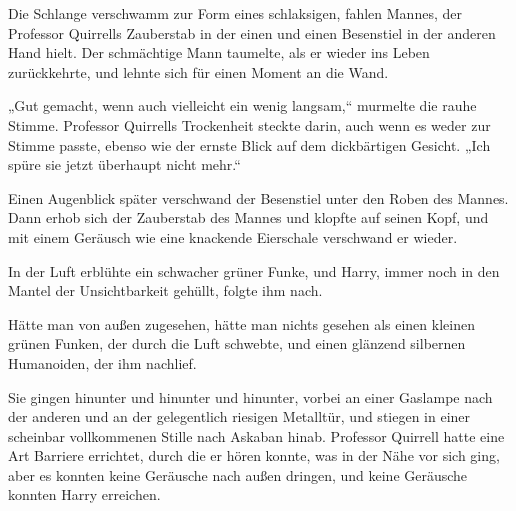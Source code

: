Die Schlange verschwamm zur Form eines schlaksigen, fahlen Mannes, der Professor Quirrells Zauberstab in der einen und einen Besenstiel in der anderen Hand hielt. Der schmächtige Mann taumelte, als er wieder ins Leben zurückkehrte, und lehnte sich für einen Moment an die Wand.

„Gut gemacht, wenn auch vielleicht ein wenig langsam,“ murmelte die rauhe Stimme. Professor Quirrells Trockenheit steckte darin, auch wenn es weder zur Stimme passte, ebenso wie der ernste Blick auf dem dickbärtigen Gesicht. „Ich spüre sie jetzt überhaupt nicht mehr.“

Einen Augenblick später verschwand der Besenstiel unter den Roben des Mannes. Dann erhob sich der Zauberstab des Mannes und klopfte auf seinen Kopf, und mit einem Geräusch wie eine knackende Eierschale verschwand er wieder.

In der Luft erblühte ein schwacher grüner Funke, und Harry, immer noch in den Mantel der Unsichtbarkeit gehüllt, folgte ihm nach.

Hätte man von außen zugesehen, hätte man nichts gesehen als einen kleinen grünen Funken, der durch die Luft schwebte, und einen glänzend silbernen Humanoiden, der ihm nachlief.

\later

Sie gingen hinunter und hinunter und hinunter, vorbei an einer Gaslampe nach der anderen und an der gelegentlich riesigen Metalltür, und stiegen in einer scheinbar vollkommenen Stille nach Askaban hinab. Professor Quirrell hatte eine Art Barriere errichtet, durch die er hören konnte, was in der Nähe vor sich ging, aber es konnten keine Geräusche nach außen dringen, und keine Geräusche konnten Harry erreichen.


